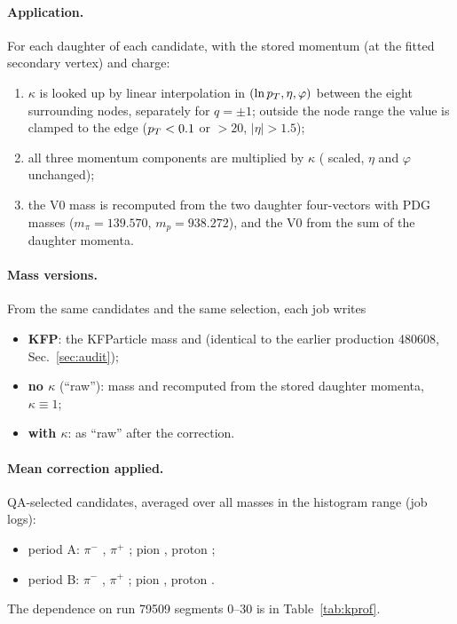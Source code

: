 \paragraph{Application.} For each daughter of each candidate, with the stored momentum (at the fitted secondary vertex) and charge:
\begin{enumerate}
\item $\kappa$ is looked up by linear interpolation in $(\ln p_T,\eta,\varphi)$ between the eight surrounding nodes, separately
  for $q=\pm1$; outside the node range the value is clamped to the edge ($p_T<0.1$ or $>20$\gevc, $|\eta|>1.5$);
\item all three momentum components are multiplied by $\kappa$ (\pt{} scaled, $\eta$ and $\varphi$ unchanged);
\item the V0 mass is recomputed from the two daughter four-vectors with PDG masses ($m_\pi=139.570$, $m_p=938.272$\mevcc),
  and the V0 \pt{} from the sum of the daughter momenta.
\end{enumerate}

\paragraph{Mass versions.} From the same candidates and the same selection, each job writes
\begin{itemize}
\item \textbf{KFP}: the KFParticle mass and \pt{} (identical to the earlier production 480608, Sec.~\ref{sec:audit});
\item \textbf{no $\kappa$} (``raw''): mass and \pt{} recomputed from the stored daughter momenta, $\kappa\equiv1$;
\item \textbf{with $\kappa$}: as ``raw'' after the correction.
\end{itemize}


\paragraph{Mean correction applied.} QA-selected candidates, averaged over all masses in the histogram range (job logs):
\begin{itemize}
\item period A: \Ks{} $\pi^-$ \PerAKapKsOne, $\pi^+$ \PerAKapKsTwo; \La{} pion \PerAKapLaOne, proton \PerAKapLaTwo;
\item period B: \Ks{} $\pi^-$ \PerBKapKsOne, $\pi^+$ \PerBKapKsTwo; \La{} pion \PerBKapLaOne, proton \PerBKapLaTwo.
\end{itemize}
The \pt{} dependence on run 79509 segments 0--30 is in Table~\ref{tab:kprof}.


